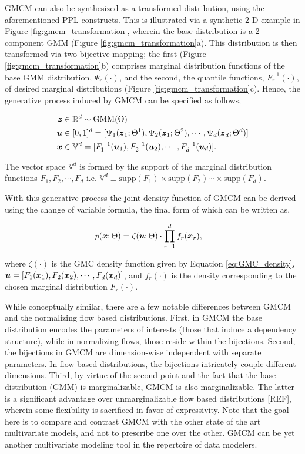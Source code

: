 \documentclass{article}
\theoremstyle{plain}
\theoremstyle{definition}
\theoremstyle{remark}
\begin{document}
 

GMCM can also be synthesized as a transformed distribution, using the aforementioned PPL constructs. This is illustrated via a synthetic 2-D example in Figure \ref{fig:gmcm_transformation}, wherein the base distribution is a 2-component GMM (Figure \ref{fig:gmcm_transformation}a). This distribution is then transformed via two bijective mapping; the first (Figure \ref{fig:gmcm_transformation}b) comprises marginal distribution functions of the base GMM distribution, $\Psi_r(\cdot)$, and the second, the quantile functions, $F^{-1}_r(\cdot)$, of desired marginal distributions (Figure \ref{fig:gmcm_transformation}c). Hence, the generative process induced by GMCM can be specified as follows,

\begin{align*}
\boldsymbol{z}& \in \mathbb{R}^d  \sim \text{GMM}(\Theta) \\
\boldsymbol{u}& \in [0,1]^d = [\Psi_1(\boldsymbol{z}_1;\Theta^1), \Psi_2(\boldsymbol{z}_1;\Theta^2), \cdots, \Psi_d(\boldsymbol{z}_d;\Theta^d)] \\
\boldsymbol{x}& \in \mathbb{V}^d = [F^{-1}_1(\boldsymbol{u}_1), F^{-1}_2(\boldsymbol{u}_2), \cdots, F^{-1}_d(\boldsymbol{u}_d)].
\end{align*}

The vector space $\mathbb{V}^d$ is formed by the support of the marginal distribution functions $F_1, F_2,\cdots, F_d$ i.e. $\mathbb{V}^d \equiv \text{supp}(F_1)\times \text{supp}(F_2)\cdots\times \text{supp}(F_d)$.

With this generative process the joint density function of GMCM can be derived using the change of variable formula, the final form of which can be written as,

\begin{align}\label{eq:GMCM_density}
p(\boldsymbol{x};\Theta)&= \zeta(\boldsymbol{u};\Theta) \cdot \prod\limits_{r=1}^{d}f_r(\boldsymbol{x}_r),
\end{align}

where $\zeta(\cdot)$ is the GMC density function given by Equation \eqref{eq:GMC_density}, $\boldsymbol{u} = [F_1(\boldsymbol{x}_1), F_2(\boldsymbol{x}_2), \cdots, F_d(\boldsymbol{x}_d) ]$, and $f_r(\cdot)$ is the density corresponding to the chosen marginal distribution $F_r(\cdot)$.

While conceptually similar, there are a few notable differences between GMCM and the normalizing flow based distributions. First, in GMCM the base distribution encodes the parameters of interests (those that induce a dependency structure), while in normalizing flows, those reside within the bijections. Second, the bijections in GMCM are dimension-wise independent with separate parameters. In flow based distributions, the bijections intricately couple different dimensions. Third, by virtue of the second point and the fact that the base distribution (GMM) is marginalizable, GMCM is also marginalizable. The latter is a significant advantage over unmarginalizable flow based distributions [REF], wherein some flexibility is sacrificed in favor of expressivity. Note that the goal here is to compare and contrast GMCM with the other state of the art multivariate models, and not to prescribe one over the other. GMCM can be yet another multivariate modeling tool in the repertoire of data modelers.
\end{document}
